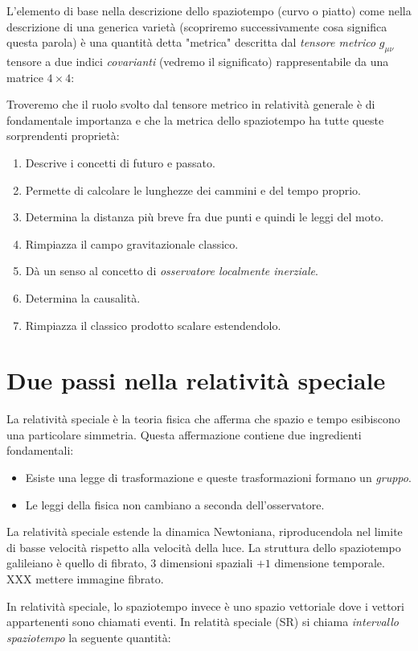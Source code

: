 \documentclass[twoside]{article}
\begin{document}
L'elemento di base nella descrizione dello spaziotempo (curvo o piatto) come nella descrizione di una generica varietà (scopriremo successivamente cosa significa questa parola) è una quantità detta "metrica" descritta dal \emph{tensore metrico} $g_{\mu \nu}$ tensore a due indici \emph{covarianti} (vedremo il significato) rappresentabile da una matrice $4\times 4$:

Troveremo che il ruolo svolto dal tensore metrico in relatività generale è di fondamentale importanza e che la metrica dello spaziotempo ha tutte queste sorprendenti proprietà:
\begin{enumerate}
	\item Descrive i concetti di futuro e passato.
	\item Permette di calcolare le lunghezze dei cammini e del tempo proprio.
	\item Determina la distanza più breve fra due punti e quindi le leggi del moto.
	\item Rimpiazza il campo gravitazionale classico.
	\item Dà un senso al concetto di \emph{osservatore localmente inerziale}.
	\item Determina la causalità.
	\item Rimpiazza il classico prodotto scalare estendendolo.
\end{enumerate}
\newpage
\section{Due passi nella relatività speciale}
La relatività speciale è la teoria fisica che afferma che spazio e tempo esibiscono una particolare simmetria. Questa affermazione contiene due ingredienti fondamentali:
\begin{itemize}
 \item Esiste una legge di trasformazione e queste trasformazioni formano un \emph{gruppo}.
 \item Le leggi della fisica non cambiano a seconda dell'osservatore.
\end{itemize}

La relatività speciale estende la dinamica Newtoniana, riproducendola nel limite di basse velocità rispetto alla velocità della luce.
La struttura dello spaziotempo galileiano è quello di fibrato, $3$ dimensioni spaziali $+1$ dimensione temporale.
XXX mettere immagine fibrato.

In relatività speciale, lo spaziotempo invece è uno spazio vettoriale dove i vettori appartenenti sono chiamati eventi. In relatità speciale (SR) si chiama \emph{intervallo spaziotempo} la seguente quantità:
\end{document}
